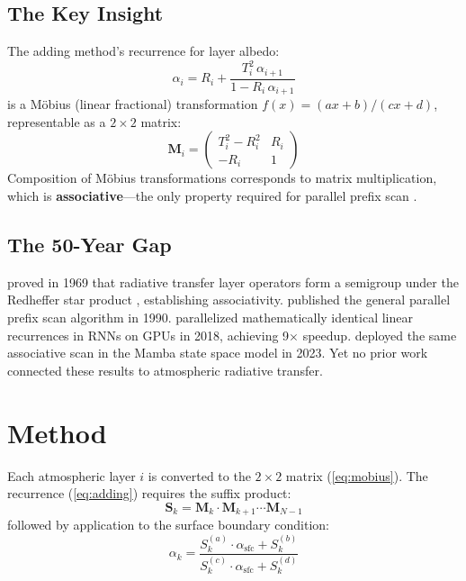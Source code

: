 \documentclass[12pt,letterpaper]{article}
\begin{document}
\subsection{The Key Insight}

The adding method's recurrence for layer albedo:
\begin{equation}
\alpha_i = R_i + \frac{T_i^2 \, \alpha_{i+1}}{1 - R_i \, \alpha_{i+1}}
\label{eq:adding}
\end{equation}
is a M\"{o}bius (linear fractional) transformation $f(x) = (ax+b)/(cx+d)$, representable as a $2\times 2$ matrix:
\begin{equation}
\mathbf{M}_i = \begin{pmatrix} T_i^2 - R_i^2 & R_i \\ -R_i & 1 \end{pmatrix}
\label{eq:mobius}
\end{equation}
Composition of M\"{o}bius transformations corresponds to matrix multiplication, which is \textbf{associative}---the only property required for parallel prefix scan \citep{blelloch1990}.

\subsection{The 50-Year Gap}

\citet{grant1969} proved in 1969 that radiative transfer layer operators form a semigroup under the Redheffer star product \citep{redheffer1959}, establishing associativity. \citet{blelloch1990} published the general parallel prefix scan algorithm in 1990. \citet{martin2018} parallelized mathematically identical linear recurrences in RNNs on GPUs in 2018, achieving 9$\times$ speedup. \citet{gu2023} deployed the same associative scan in the Mamba state space model in 2023. Yet no prior work connected these results to atmospheric radiative transfer.

\section{Method}

Each atmospheric layer $i$ is converted to the $2\times 2$ matrix (\ref{eq:mobius}). The recurrence (\ref{eq:adding}) requires the suffix product:
\begin{equation}
\mathbf{S}_k = \mathbf{M}_k \cdot \mathbf{M}_{k+1} \cdots \mathbf{M}_{N-1}
\end{equation}
followed by application to the surface boundary condition:
\begin{equation}
\alpha_k = \frac{S_k^{(a)} \cdot \alpha_{\text{sfc}} + S_k^{(b)}}{S_k^{(c)} \cdot \alpha_{\text{sfc}} + S_k^{(d)}}
\end{equation}
\end{document}
